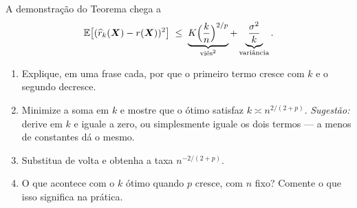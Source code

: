 \documentclass[11pt,a4paper]{article}
\begin{document}
\begin{exercicio}
A demonstração do Teorema chega a
\[
  \mathbb{E}\big[(\widehat{r}_k(\bm{X})-r(\bm{X}))^2\big]
   \;\le\; \underbrace{K\Big(\frac{k}{n}\Big)^{2/p}}_{\text{viés}^2}
        + \underbrace{\frac{\sigma^2}{k}}_{\text{variância}} .
\]
\begin{enumerate}[label=(\alph*),leftmargin=1.1cm]
  \item Explique, em uma frase cada, por que o primeiro termo cresce com $k$ e o
        segundo decresce.
  \item Minimize a soma em $k$ e mostre que o ótimo satisfaz
        $k \asymp n^{2/(2+p)}$. \emph{Sugestão:} derive em $k$ e iguale a zero, ou
        simplesmente iguale os dois termos --- a menos de constantes dá o mesmo.
  \item Substitua de volta e obtenha a taxa $n^{-2/(2+p)}$.
  \item O que acontece com o $k$ ótimo quando $p$ cresce, com $n$ fixo? Comente o
        que isso significa na prática.
\end{enumerate}
\end{exercicio}
\end{document}
